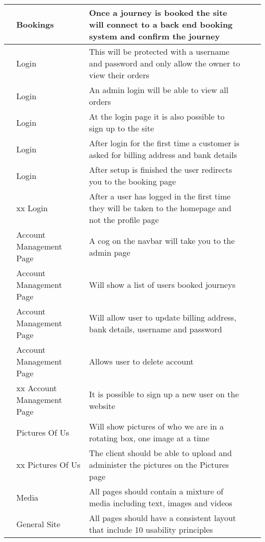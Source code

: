 \documentclass{article}
\newcounter{rowcount}
\begin{document}
\begin{tabular} {>{\stepcounter{rowcount}\therowcount}p{0.5cm}@{}*{2}{p{3cm}|p{12cm}}}
    \hline
    & Bookings & Once a journey is booked the site will connect to a back end booking system and confirm the journey \\
    \hline
    & Login & This will be protected with a username and password and only allow the owner to view their orders \\
    \hline
    & Login & An admin login will be able to view all orders \\
    \hline
    & Login & At the login page it is also possible to sign up to the site \\
    \hline
    & Login & After login for the first time a customer is asked for billing address and bank details \\
    \hline
    & Login & After setup is finished the user redirects you to the booking page \\
    \hline
    & xx Login & After a user has logged in the first time they will be taken to the homepage and not the profile page \\
    \hline
    & Account Management Page & A cog on the navbar will take you to the admin page \\
    \hline
    & Account Management Page & Will show a list of users booked journeys \\
    \hline
    & Account Management Page & Will allow user to update billing address, bank details, username and password \\
    \hline
    & Account Management Page & Allows user to delete account \\
    \hline
    & xx Account Management Page & It is possible to sign up a new user on the website \\
    \hline
    & Pictures Of Us & Will show pictures of who we are in a rotating box, one image at a time\\
    \hline
    & xx Pictures Of Us & The client should be able to upload and administer the pictures on the Pictures page\\
    \hline 
    & Media & All pages should contain a mixture of media including text, images and videos \\
    \hline
    & General Site & All pages should have a consistent layout that include 10 usability principles  \\
    \hline



    \end{tabular}
\end{document}
